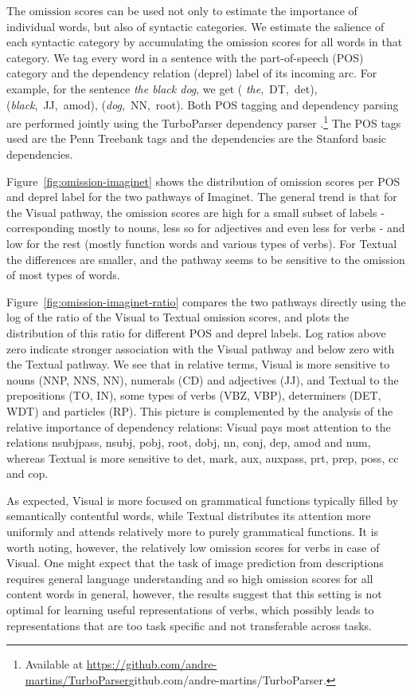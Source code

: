 The $\mathrm{omission}$ scores can be used not only to
estimate the importance of individual words, but also of syntactic
categories. We estimate the salience of each syntactic category by
accumulating the omission scores for all words in that category. We
tag every word in a sentence with the part-of-speech (POS) category
and the dependency relation (deprel) label of its incoming arc. For
example, for the sentence \emph{the black dog}, we get ({\it
  the},~DT,~det), 
({\it black},~JJ,~amod), ({\it dog},~NN,~root). 
Both POS tagging and dependency parsing are performed jointly
using the TurboParser dependency parser \cite{martins2013turning}.\footnote{Available at
  \url{https://github.com/andre-martins/TurboParser}{github.com/andre-martins/TurboParser}.} The POS tags used are the Penn Treebank tags and the dependencies are 
the Stanford basic dependencies.


Figure~\ref{fig:omission-imaginet} shows the distribution of omission
scores per POS and deprel label for the two pathways of {\sc Imaginet}. 
The general trend is that for the {\sc Visual} pathway, the omission scores are
high for a small subset of labels - corresponding mostly to nouns, less so for
adjectives and even less for verbs - and low for the rest (mostly function words and
various types of verbs). For {\sc Textual} the differences are \label{edit:textualomission}
smaller, and the pathway seems to be sensitive to the omission of most
types of words.  

Figure~\ref{fig:omission-imaginet-ratio} compares the
two pathways directly using the log of the ratio of the {\sc Visual}
to {\sc Textual} omission scores, and plots the distribution of this
ratio for different POS and deprel labels.  Log ratios above zero
indicate stronger association with the {\sc Visual} pathway and below
zero with the {\sc Textual} pathway. We see that in relative terms,
{\sc Visual} is more sensitive to nouns (NNP, NNS, NN), numerals (CD)
and adjectives (JJ), and {\sc Textual} to the prepositions (TO, IN),
some types of verbs (VBZ, VBP), determiners (DET, WDT) and
particles (RP). This picture is complemented by the analysis of the
relative importance of dependency relations: {\sc Visual} pays most
attention to the relations {\sc nsubjpass, nsubj, pobj, root, dobj,
  nn, conj, dep, amod} and {\sc num}, whereas {\sc Textual} is more
sensitive to {\sc det, mark, aux, auxpass, prt, prep, poss, cc} and
{\sc cop}. 

As expected, {\sc Visual} is more focused on grammatical
functions typically filled by semantically contentful words, while
{\sc Textual} distributes its attention more uniformly and 
attends relatively more to purely grammatical functions. 
It is worth noting, however, the relatively low omission scores for verbs in case \label{edit:generality}
of {\sc Visual}. One might expect that the task of image prediction from
descriptions requires general language understanding and so high omission
scores for all content words in general, however, the results
suggest that this setting is not optimal for learning useful representations of verbs,
which possibly leads to representations that are too task specific 
and not transferable across tasks. 


